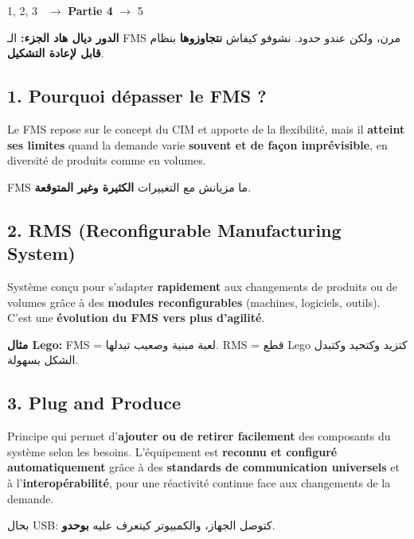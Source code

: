 \documentclass[11pt,a4paper]{article}
\newcommand{\fr}[1]{\textfrench{#1}}
\begin{document}
\begin{carte}
1, 2, 3 \checkmark\ $\rightarrow$ \textbf{Partie 4} $\rightarrow$ 5
\par\begin{Arabic}
\textbf{الدور ديال هاد الجزء:} الـ \fr{FMS} مرن، ولكن عندو حدود. نشوفو كيفاش \textbf{نتجاوزوها} بنظام \textbf{قابل لإعادة التشكيل}.
\end{Arabic}
\end{carte}

\subsection*{1. Pourquoi dépasser le FMS ?}
Le FMS repose sur le concept du CIM et apporte de la flexibilité, mais il \textbf{atteint ses limites} quand la demande varie \textbf{souvent et de façon imprévisible}, en diversité de produits comme en volumes.
\par\begin{Arabic}
\fr{FMS} ما مزيانش مع التغييرات \textbf{الكثيرة وغير المتوقعة}.
\end{Arabic}

\subsection*{2. RMS (Reconfigurable Manufacturing System)}
Système conçu pour s'adapter \textbf{rapidement} aux changements de produits ou de volumes grâce à des \textbf{modules reconfigurables} (machines, logiciels, outils). C'est une \textbf{évolution du FMS vers plus d'agilité}.
\begin{exemple}
\par\begin{Arabic}
\textbf{مثال \fr{Lego}:} \fr{FMS} = لعبة مبنية وصعيب تبدلها. \fr{RMS} = قطع \fr{Lego} كتزيد وكتحيد وكتبدل الشكل بسهولة.
\end{Arabic}
\end{exemple}

\subsection*{3. Plug and Produce}
\begin{tcolorbox}[colback=white,colframe=bleu,title=Définition,fonttitle=\bfseries]
Principe qui permet d'\textbf{ajouter ou de retirer facilement} des composants du système selon les besoins. L'équipement est \textbf{reconnu et configuré automatiquement} grâce à des \textbf{standards de communication universels} et à l'\textbf{interopérabilité}, pour une réactivité continue face aux changements de la demande.
\end{tcolorbox}
\par\begin{Arabic}
بحال \fr{USB}: كتوصل الجهاز، والكمبيوتر كيتعرف عليه \textbf{بوحدو}.
\end{Arabic}
\end{document}
